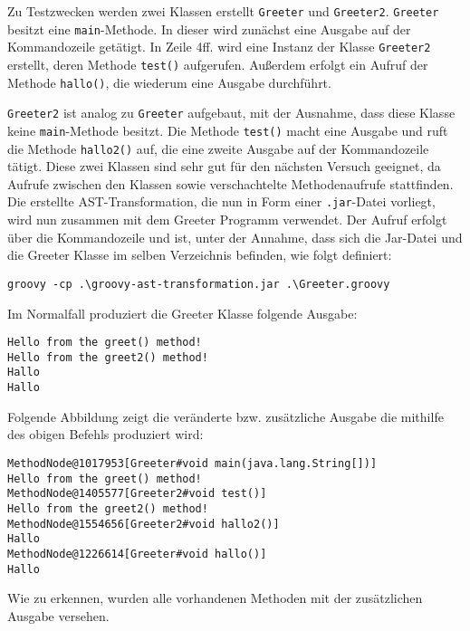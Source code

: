 Zu Testzwecken werden zwei Klassen erstellt \texttt{Greeter} und \texttt{Greeter2}. 
\texttt{Greeter} besitzt eine \texttt{main}-Methode. 
In dieser wird zunächst eine Ausgabe auf der Kommandozeile getätigt. 
In Zeile 4ff. wird eine Instanz der Klasse \texttt{Greeter2} erstellt, deren Methode \texttt{test()} aufgerufen. Außerdem erfolgt ein Aufruf der Methode \texttt{hallo()}, die wiederum eine Ausgabe durchführt.

\texttt{Greeter2} ist analog zu \texttt{Greeter} aufgebaut, mit der Ausnahme, dass diese Klasse keine \texttt{main}-Methode besitzt. 
Die Methode \texttt{test()} macht eine Ausgabe und ruft die Methode \texttt{hallo2()} auf, die eine zweite Ausgabe auf der Kommandozeile tätigt.
Diese zwei Klassen sind sehr gut für den nächsten Versuch geeignet, da Aufrufe zwischen den Klassen sowie verschachtelte Methodenaufrufe stattfinden.
Die erstellte AST-Transformation, die nun in Form einer \texttt{.jar}-Datei vorliegt, wird nun zusammen mit dem Greeter Programm verwendet. 
Der Aufruf erfolgt über die Kommandozeile und ist, unter der Annahme, dass sich die Jar-Datei und die Greeter Klasse im selben Verzeichnis befinden, wie folgt definiert:

\begin{lstlisting}
groovy -cp .\groovy-ast-transformation.jar .\Greeter.groovy
\end{lstlisting}

Im Normalfall produziert die Greeter Klasse folgende Ausgabe:

\begin{lstlisting}
Hello from the greet() method!
Hello from the greet2() method!
Hallo
Hallo
\end{lstlisting}


Folgende Abbildung zeigt die veränderte bzw. zusätzliche Ausgabe die mithilfe des obigen Befehls produziert wird:


\begin{lstlisting}
MethodNode@1017953[Greeter#void main(java.lang.String[])]
Hello from the greet() method!
MethodNode@1405577[Greeter2#void test()]
Hello from the greet2() method!
MethodNode@1554656[Greeter2#void hallo2()]
Hallo
MethodNode@1226614[Greeter#void hallo()]
Hallo
\end{lstlisting}


Wie zu erkennen, wurden alle vorhandenen Methoden mit der zusätzlichen Ausgabe versehen. 


